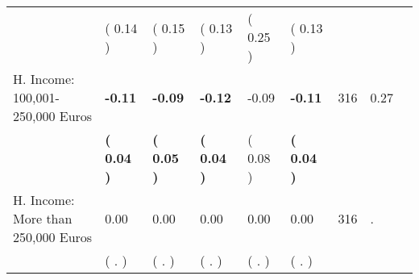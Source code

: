 \begin{tabular}{L{6.2cm} C{1.8cm} C{1.8cm} C{1.8cm} C{1.8cm} C{1.8cm} C{1.8cm} C{0.3cm} C{0.3cm}}
 & (     0.14 ) & (     0.15 ) & (     0.13 ) & (     0.25 ) & (     0.13 )  & \\
H. Income: 100,001-250,000 Euros & \textbf{    -0.11} & \textbf{    -0.09} & \textbf{    -0.12} &     -0.09 & \textbf{    -0.11}  & 316 &       0.27 \\ 
 & \textbf{(     0.04 )} & \textbf{(     0.05 )} & \textbf{(     0.04 )} & (     0.08 ) & \textbf{(     0.04 )}  & \\
H. Income: More than 250,000 Euros &      0.00 &      0.00 &      0.00 &      0.00 &      0.00  & 316 &          . \\ 
 & (        . ) & (        . ) & (        . ) & (        . ) & (        . )  & \\
\bottomrule
\end{tabular}
